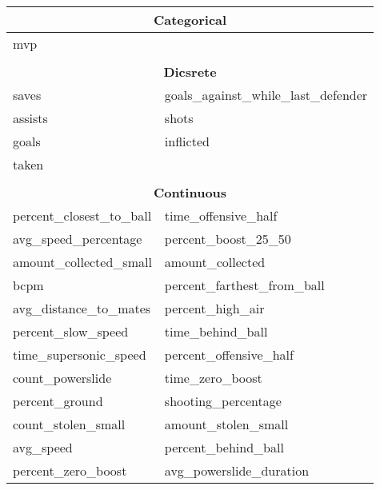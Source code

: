 \pagebreak
\begin{longtable}{p{} p{}} 
\toprule
\multicolumn{2}{c}{\textbf{Categorical}}                                        \\
\midrule
mvp                                     &                                         \\
 & \\
\toprule
\multicolumn{2}{c}{\textbf{Dicsrete}} \\
\midrule
saves                                   & goals\_against\_while\_last\_defender   \\
assists                                 & shots                                   \\
goals                                   & inflicted                               \\
taken                                   &                                         \\
& \\
\toprule
\multicolumn{2}{c}{\textbf{Continuous}}                                           \\
\midrule
percent\_closest\_to\_ball              & time\_offensive\_half                   \\
avg\_speed\_percentage                  & percent\_boost\_25\_50                  \\
amount\_collected\_small                & amount\_collected                       \\
bcpm                                    & percent\_farthest\_from\_ball           \\
avg\_distance\_to\_mates                & percent\_high\_air                      \\
percent\_slow\_speed                    & time\_behind\_ball                      \\
time\_supersonic\_speed                 & percent\_offensive\_half                \\
count\_powerslide                       & time\_zero\_boost                       \\
percent\_ground                         & shooting\_percentage                    \\
count\_stolen\_small                    & amount\_stolen\_small                   \\
avg\_speed                              & percent\_behind\_ball                   \\
percent\_zero\_boost                    & avg\_powerslide\_duration               \\

\end{longtable}
